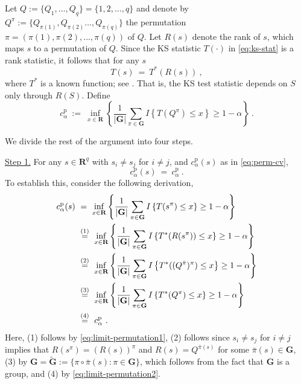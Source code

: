 \documentclass[11pt]{article}
\numberwithin{equation}{section}
\begin{document}
Let $Q:=\{Q_{1},\dots ,Q_{q}\}=\{1,2,\dots ,q\}$ and denote by $Q^{\pi }:=\{Q_{\pi (1)},Q_{\pi (2)}\dots ,Q_{\pi (q)}\}$ the permutation $\pi =(\pi (1),\pi (2),...,\pi \left( q\right) )$ of $Q$. Let $R(s)$ denote the rank of $s$, which maps $s$ to a permutation of $Q$. Since the KS statistic $T(\cdot )$ in \eqref{eq:ks-stat} is a rank statistic, it follows that for any $s$
\begin{equation}
T(s)~=~T^{\ast }(R(s))~,  \label{eq:limit-permutation1}
\end{equation}%
where $T^{\ast }$ is a known function; see \citet[page 99]{hajek/sidak/sen:99}. That is, the KS test statistic depends on $S$ only through $R(S)$. Define 
\begin{equation}
c_{\alpha }^{\mathrm{p}}~:=~\inf_{x\in \mathbf{R}}\left\{ \frac{1}{ \left\vert \mathbf{G}\right\vert }\sum_{\pi \in \mathbf{G}}I\left\{ T(Q^{\pi })\leq x\right\} \geq 1-\alpha \right\} ~.  \label{eq:limit-permutation2}
\end{equation}

We divide the rest of the argument into four steps.

\noindent \underline{Step 1.} For any $s\in \mathbf{R}^{q}$ with $s_{i}\not=s_{j} $ for $i\not=j$, and $c_{\alpha }^{\mathrm{p}}(s)$ as in \eqref{eq:perm-cv},
\begin{equation*}
c_{\alpha }^{\mathrm{p}}(s)~=~c_{\alpha }^{\mathrm{p}}~.
\end{equation*}
To establish this, consider the following derivation,
\begin{align}
c_{\alpha }^{\mathrm{p}}(s)& ~=~\inf_{x\in \mathbf{R}}\left\{ \frac{1}{ \left\vert \mathbf{G}\right\vert }\sum_{\pi \in \mathbf{G}}I\left\{ T(s^{\pi })\leq x\right\} \geq 1-\alpha \right\}   \notag \\
& ~\overset{(1)}{=}~\inf_{x\in \mathbf{R}}\left\{ \frac{1}{\left\vert \mathbf{G}\right\vert }\sum_{\pi \in \mathbf{G}}I\left\{ T^{\ast }(R(s^{\pi }))\leq x\right\} \geq 1-\alpha \right\}   \notag \\
& ~\overset{(2)}{=}~\inf_{x\in \mathbf{R}}\left\{ \frac{1}{\left\vert \mathbf{G}\right\vert }\sum_{\pi \in \mathbf{G}}I\left\{ T^{\ast }((Q^{\bar{ \pi}})^{\pi })\leq x\right\} \geq 1-\alpha \right\}   \notag \\
& ~\overset{(3)}{=}~\inf_{x\in \mathbf{R}}\left\{ \frac{1}{\left\vert \mathbf{G}\right\vert }\sum_{{\pi }\in \mathbf{G}}I\left\{ T^{\ast }(Q^{{\pi }})\leq x\right\} \geq 1-\alpha \right\}\notag \\
&~\overset{(4)}{=}~c_{\alpha }^{\mathrm{p}}~.  \label{eq:limit-permutation3}
\end{align}
Here, (1) follows by \eqref{eq:limit-permutation1}, (2) follows since $ s_{i}\not=s_{j}$ for $i\not=j$ implies that $R(s^{\pi })=(R(s))^{\pi }$ and $ R(s)=Q^{\bar{\pi}(s)}$ for some $\bar{\pi}\left( s\right) \in \mathbf{G}$, (3) by $\mathbf{G}=\tilde{\mathbf{G}}:=\{\pi \circ \bar{\pi}(s):\pi \in \mathbf{G}\}$, which follows from the fact that $\mathbf{G}$ is a group, and (4) by \eqref{eq:limit-permutation2}.
\end{document}
